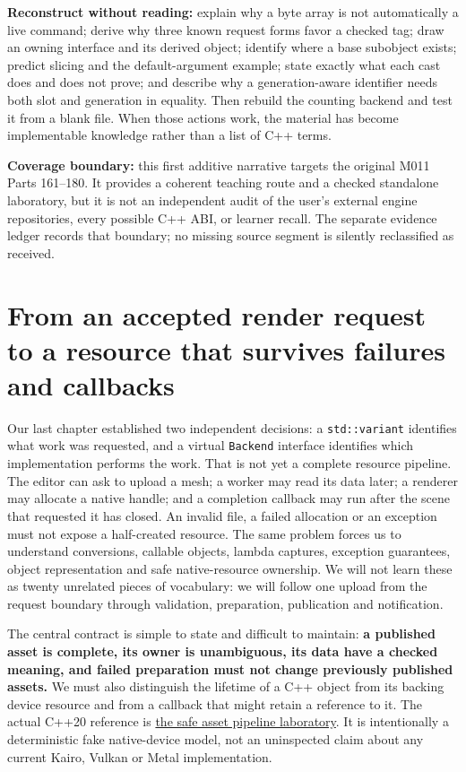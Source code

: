 \textbf{Reconstruct without reading:} explain why a byte array is not automatically a live command; derive why three known request forms favor a checked tag; draw an owning interface and its derived object; identify where a base subobject exists; predict slicing and the default-argument example; state exactly what each cast does and does not prove; and describe why a generation-aware identifier needs both slot and generation in equality. Then rebuild the counting backend and test it from a blank file. When those actions work, the material has become implementable knowledge rather than a list of C++ terms.

\textbf{Coverage boundary:} this first additive narrative targets the original M011 Parts 161--180. It provides a coherent teaching route and a checked standalone laboratory, but it is not an independent audit of the user's external engine repositories, every possible C++ ABI, or learner recall. The separate evidence ledger records that boundary; no missing source segment is silently reclassified as received.

\section{From an accepted render request to a resource that survives failures and callbacks}\label{05-engine-i-ch004-from-an-accepted-render-request-to-a-resource-that-survives-failures-and-callbacks}

Our last chapter established two independent decisions: a \texttt{std::variant} identifies what work was requested, and a virtual \texttt{Backend} interface identifies which implementation performs the work. That is not yet a complete resource pipeline. The editor can ask to upload a mesh; a worker may read its data later; a renderer may allocate a native handle; and a completion callback may run after the scene that requested it has closed. An invalid file, a failed allocation or an exception must not expose a half-created resource. The same problem forces us to understand conversions, callable objects, lambda captures, exception guarantees, object representation and safe native-resource ownership. We will not learn these as twenty unrelated pieces of vocabulary: we will follow one upload from the request boundary through validation, preparation, publication and notification.

The central contract is simple to state and difficult to maintain: \textbf{a published asset is complete, its owner is unambiguous, its data have a checked meaning, and failed preparation must not change previously published assets.} We must also distinguish the lifetime of a C++ object from its backing device resource and from a callback that might retain a reference to it. The actual C++20 reference is \hyperref[source-file-32e93bc026677e074aaa7771]{the safe asset pipeline laboratory}. It is intentionally a deterministic fake native-device model, not an uninspected claim about any current Kairo, Vulkan or Metal implementation.

